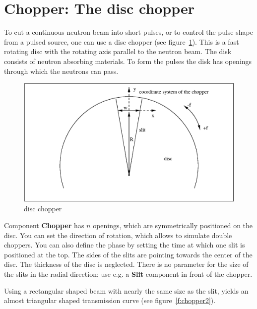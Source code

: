 
\section{Chopper: The disc chopper}
\label{s:chopper}


To cut a continuous neutron beam into short pulses, or to control
the pulse shape from a pulsed source, one can use a disc
chopper (see figure~\ref{f:chopper1}). This is a fast rotating disc with the
rotating axis parallel to the neutron beam. The disk consists of neutron
absorbing materials. To form the pulses the disk has openings through which
the neutrons can pass.

\begin{figure}[ht]
\includegraphics[width=1.0\linewidth]{figures/Chopper.eps}
\caption{disc chopper\label{f:chopper1}}
\end{figure}

Component {\bf Chopper} has $n$ openings, which are
symmetrically positioned on the disc. You can set the direction of
rotation, which allows to simulate double choppers. You can also define
the phase by setting the time at which one slit is positioned at the
top. The sides of the slits are pointing towards the center of the disc.
The thickness of the disc is neglected.  There is no parameter for the
size of the slits in the radial direction;
use e.g. a {\bf Slit} component in front of the chopper.

Using a rectangular shaped beam with nearly the same
size as the slit, yields an almost triangular shaped
transmission curve (see figure~\ref{f:chopper2}).

